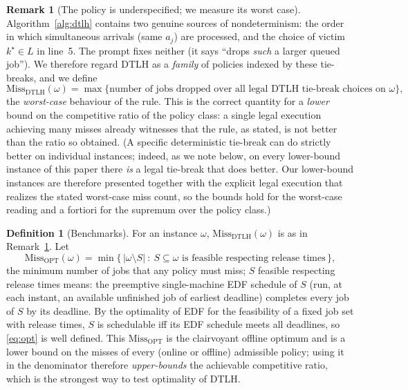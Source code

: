 \documentclass{amsart}
\theoremstyle{definition}
\newtheorem{definition}[theorem]{Definition}
\newtheorem{remark}[theorem]{Remark}
\begin{document}
\begin{remark}[The policy is underspecified; we measure its worst case]
\label{rem:tiebreak}
Algorithm~\ref{alg:dtlh} contains two genuine sources of nondeterminism: the
order in which simultaneous arrivals (same $a_j$) are processed, and the choice
of victim $k^\star\in L$ in line~5. The prompt fixes neither (it says ``drops
\emph{such} a larger queued job''). We therefore regard DTLH as a \emph{family}
of policies indexed by these tie-breaks, and we define
\[
\mathrm{Miss}_{\mathrm{DTLH}}(\omega)
=\max\{\text{number of jobs dropped over all legal DTLH tie-break choices on }\omega\},
\]
the \emph{worst-case} behaviour of the rule. This is the correct quantity for a
\emph{lower} bound on the competitive ratio of the policy class: a single legal
execution achieving many misses already witnesses that the rule, as stated, is
not better than the ratio so obtained. (A specific deterministic tie-break can do
strictly better on individual instances; indeed, as we note below, on every
lower-bound instance of this paper there \emph{is} a legal tie-break that does
better. Our lower-bound instances are therefore presented together with the
explicit legal execution that realizes the stated worst-case miss count, so the
bounds hold for the worst-case reading and a fortiori for the supremum over the
policy class.)
\end{remark}

\begin{definition}[Benchmarks]
For an instance $\omega$, $\mathrm{Miss}_{\mathrm{DTLH}}(\omega)$ is as in
Remark~\ref{rem:tiebreak}. Let
\begin{equation}\label{eq:opt}
\mathrm{Miss}_{\mathrm{OPT}}(\omega)
=\min\Big\{\,|\omega\setminus S|\ :\ S\subseteq\omega \text{ is feasible respecting release times}\,\Big\},
\end{equation}
the minimum number of jobs that any policy must miss; $S$ feasible respecting
release times means: the preemptive single-machine EDF schedule of $S$ (run, at
each instant, an available unfinished job of earliest deadline) completes every
job of $S$ by its deadline. By the optimality of EDF for the feasibility of a
fixed job set with release times, $S$ is schedulable iff its EDF schedule meets
all deadlines, so \eqref{eq:opt} is well defined. This
$\mathrm{Miss}_{\mathrm{OPT}}$ is the clairvoyant offline optimum and is a lower
bound on the misses of every (online or offline) admissible policy; using it in
the denominator therefore \emph{upper-bounds} the achievable competitive ratio,
which is the strongest way to test optimality of DTLH.
\end{definition}
\end{document}
